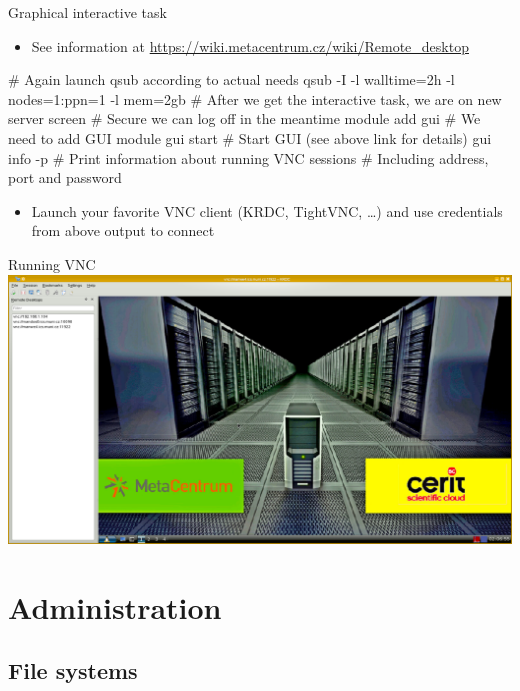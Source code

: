 \documentclass[compress, ucs, xelatex, 11pt, xcolor=svgnames,
  hyperref={
    bookmarks=true,
    unicode=true,
    colorlinks=true,
    pdftitle={Linux, command line and MetaCentrum},
    plainpages=false,
    pdfauthor={Vojtech Zeisek},
    pdfsubject={Course about use of Linux command line, writing shell scripts and using MetaCentrum of CESNET},
    pdfcreator={XeLaTeX},
    pdfkeywords={Linux, GNU, BASH, shell, command line, MetaCentrum},
    linkcolor=Red,
    anchorcolor=Blue,
    citecolor=Purple,
    filecolor=DodgerBlue,
    menucolor=DarkOrchid,
    urlcolor=DeepSkyBlue,
    pdftex},
  url={hyphens, lowtilde} %
  ]{beamer}
\begin{document}
\begin{frame}[fragile]{Graphical interactive task}
\begin{itemize}
  \item See information at \url{https://wiki.metacentrum.cz/wiki/Remote_desktop}
\end{itemize}
  \begin{bashcode}
    # Again launch qsub according to actual needs
    qsub -I -l walltime=2h -l nodes=1:ppn=1 -l mem=2gb
    # After we get the interactive task, we are on new server
    screen # Secure we can log off in the meantime
    module add gui # We need to add GUI module
    gui start # Start GUI (see above link for details)
    gui info -p # Print information about running VNC sessions
                # Including address, port and password
  \end{bashcode}
\begin{itemize}
  \item Launch your favorite VNC client (KRDC, TightVNC, \ldots) and use credentials from above output to connect
\end{itemize}
\end{frame}

\begin{frame}{Running VNC}
\includegraphics[width=\textwidth]{vnc.png}
\end{frame}

\section{Administration}

\subsection{File systems}
\end{document}
